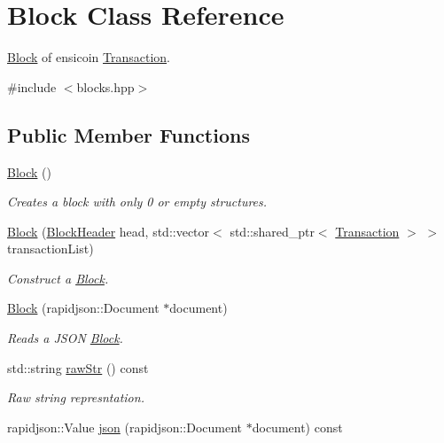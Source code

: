 \hypertarget{classBlock}{}\section{Block Class Reference}
\label{classBlock}


\mbox{\hyperlink{classBlock}{Block}} of ensicoin \mbox{\hyperlink{classTransaction}{Transaction}}.  




{\ttfamily \#include $<$blocks.\+hpp$>$}

\subsection*{Public Member Functions}
\begin{DoxyCompactItemize}
\item 
\mbox{\hyperlink{classBlock_a37658a946bf5067ad01d68d9ff086adc}{Block}} ()
\begin{DoxyCompactList}\small\item\em Creates a block with only 0 or empty structures. \end{DoxyCompactList}\item 
\mbox{\hyperlink{classBlock_a3490153019c72834ce07382dcecfde86}{Block}} (\mbox{\hyperlink{structBlockHeader}{Block\+Header}} head, std\+::vector$<$ std\+::shared\+\_\+ptr$<$ \mbox{\hyperlink{classTransaction}{Transaction}} $>$ $>$ transaction\+List)
\begin{DoxyCompactList}\small\item\em Construct a \mbox{\hyperlink{classBlock}{Block}}. \end{DoxyCompactList}\item 
\mbox{\hyperlink{classBlock_ae5c87aaeaf73bf298df7fc24753f7029}{Block}} (rapidjson\+::\+Document $\ast$document)
\begin{DoxyCompactList}\small\item\em Reads a J\+S\+ON \mbox{\hyperlink{classBlock}{Block}}. \end{DoxyCompactList}\item 
std\+::string \mbox{\hyperlink{classBlock_ae69a2e1c0d586541c5633f9d8d4da693}{raw\+Str}} () const
\begin{DoxyCompactList}\small\item\em Raw string represntation. \end{DoxyCompactList}\item 
rapidjson\+::\+Value \mbox{\hyperlink{classBlock_a9c57b74c726d68e48e96586d3511d19b}{json}} (rapidjson\+::\+Document $\ast$document) const

\end{DoxyCompactItemize}
